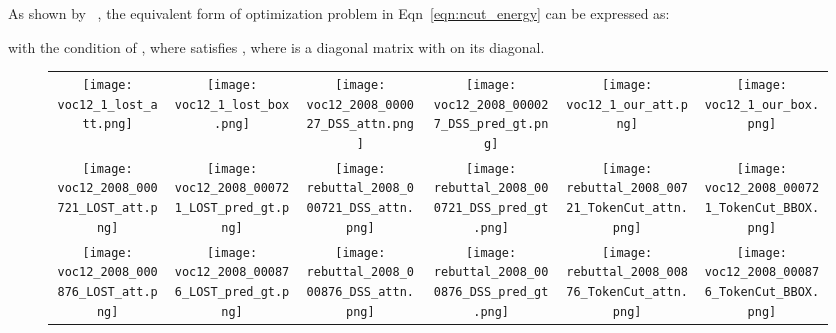 \documentclass[twocolumn]{article}
\begin{document}
As shown by ~\cite{shi2000normalized}, the equivalent form of optimization problem in Eqn~\ref{eqn:ncut_energy} can be expressed as: 

with the condition of , where  satisfies , where  is a diagonal matrix with  on its diagonal. 

\begin{figure*}[!t]
\begin{tabular}{c@{\hskip 1.3pt}c@{\hskip 1.3pt}c@{\hskip 1.3pt}c@{\hskip 1.3pt}c@{\hskip 1.3pt}c}

		

		\texttt{[image: voc12\_1\_lost\_att.png]} &
		\texttt{[image: voc12\_1\_lost\_box.png]} &
		\texttt{[image: voc12\_2008\_000027\_DSS\_attn.png]} &
        \texttt{[image: voc12\_2008\_000027\_DSS\_pred\_gt.png]} &
		\texttt{[image: voc12\_1\_our\_att.png]} &
		\texttt{[image: voc12\_1\_our\_box.png]} \\ 
		
		\texttt{[image: voc12\_2008\_000721\_LOST\_att.png]} & 
		\texttt{[image: voc12\_2008\_000721\_LOST\_pred\_gt.png]} &
		\texttt{[image: rebuttal\_2008\_000721\_DSS\_attn.png]} &
		\texttt{[image: rebuttal\_2008\_000721\_DSS\_pred\_gt.png]} &
		\texttt{[image: rebuttal\_2008\_00721\_TokenCut\_attn.png]} &
		\texttt{[image: voc12\_2008\_000721\_TokenCut\_BBOX.png]} \\
		
		\texttt{[image: voc12\_2008\_000876\_LOST\_att.png]} &
		\texttt{[image: voc12\_2008\_000876\_LOST\_pred\_gt.png]} &
		\texttt{[image: rebuttal\_2008\_000876\_DSS\_attn.png]} &
		\texttt{[image: rebuttal\_2008\_000876\_DSS\_pred\_gt.png]} &
		\texttt{[image: rebuttal\_2008\_00876\_TokenCut\_attn.png]} &
		\texttt{[image: voc12\_2008\_000876\_TokenCut\_BBOX.png]} \\
		

\end{tabular}
\end{figure*}
\end{document}
